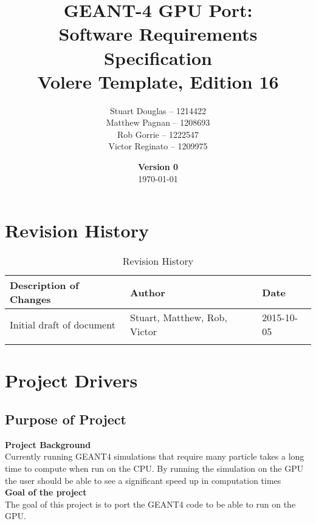 \documentclass[12pt]{article}
\title{
\LARGE GEANT-4 GPU Port:
\\\vspace{10mm}
\large \textbf{Software Requirements Specification}
\\Volere Template, Edition 16
\vspace{40mm}
}
\author{
Stuart Douglas -- 1214422
\\Matthew Pagnan -- 1208693
\\Rob Gorrie -- 1222547
\\Victor Reginato -- 1209975
\vspace{10mm}
}
\date{\vfill \textbf{Version 0}\\ \today}
\begin{document}

\maketitle
\newpage

\tableofcontents
\newpage
{}

\section{Revision History}
\begin{table}[h]
\centering
\caption{Revision History}
\begin{tabular}{l|l|l}
\Xhline{2\arrayrulewidth}
\bf Description of Changes & \bf Author & \bf Date\\\hline
Initial draft of document & Stuart, Matthew, Rob, Victor & 2015-10-05\\
\Xhline{2\arrayrulewidth}
\end{tabular}
\end{table}

\section{Project Drivers}

\subsection{Purpose of Project} %
\textbf{Project Background}\\
Currently running GEANT4 simulations that require many particle takes a long time to compute when run on the CPU. By running the simulation on the GPU the user should be able to see a significant speed up in computation times\\
\newline
\textbf{Goal of the project}\\
The goal of this project is to port the GEANT4 code to be able to run on the GPU.

\end{document}
